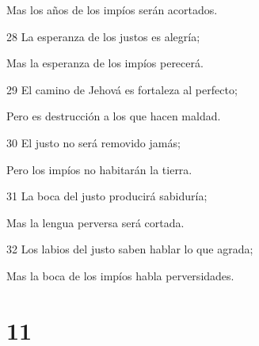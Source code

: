 \par Mas los años de los impíos serán acortados.
\par 28 La esperanza de los justos es alegría;
\par Mas la esperanza de los impíos perecerá.
\par 29 El camino de Jehová es fortaleza al perfecto;
\par Pero es destrucción a los que hacen maldad.
\par 30 El justo no será removido jamás;
\par Pero los impíos no habitarán la tierra.
\par 31 La boca del justo producirá sabiduría;
\par Mas la lengua perversa será cortada.
\par 32 Los labios del justo saben hablar lo que agrada;
\par Mas la boca de los impíos habla perversidades.

\chapter{11}

